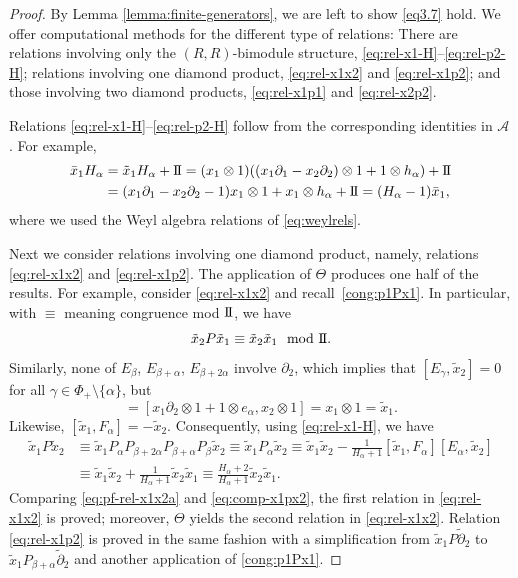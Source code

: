 \documentclass[pdftex]{sigma}
\numberwithin{equation}{section}
\newcommand{\II}{\mathrm{I\hspace{-.1em}I}}
\begin{document}
\begin{proof}
	By Lemma \ref{lemma:finite-generators}, we are left to show \eqref{eq3.7} hold. We offer computational methods for the different type of relations: There are relations involving only the $(R,R)$-bimodule structure, \eqref{eq:rel-x1-H}--\eqref{eq:rel-p2-H}; relations involving one diamond product, \eqref{eq:rel-x1x2} and \eqref{eq:rel-x1p2}; and those involving two diamond products, \eqref{eq:rel-x1p1} and \eqref{eq:rel-x2p2}.
	
	Relations \eqref{eq:rel-x1-H}--\eqref{eq:rel-p2-H} follow from the corresponding identities in $\mathscr{A}$. For example,
	\begin{align*}
		\bar x_1H_\alpha
		&
		= \tilde x_1H_\alpha+\II
		=(x_1\otimes 1)((x_1\partial_1-x_2\partial_2)\otimes 1+1\otimes h_\alpha)+\II
		\\
		&=(x_1\partial_1-x_2\partial_2-1)x_1\otimes 1+x_1\otimes h_\alpha+\II
		= (H_\alpha-1)\bar x_1,
	\end{align*}
	where we used the Weyl algebra relations of \eqref{eq:weylrels}.
	
	Next we consider relations involving one diamond product, namely, relations \eqref{eq:rel-x1x2} and \eqref{eq:rel-x1p2}. The application of $\Theta$ produces one half of the results. For example, consider \eqref{eq:rel-x1x2} and recall~\eqref{cong:p1Px1}.
	In particular, with $\equiv$ meaning congruence mod $\II$, we have
	\begin{equation}\label{eq:pf-rel-x1x2a}
		\tilde x_2 P \tilde x_1 \equiv \tilde x_2\tilde x_1 \mod{\II}.
	\end{equation}
	Similarly, none of $E_\beta$, $E_{\beta+\alpha}$, $E_{\beta+2\alpha}$ involve $\partial_2$, which implies that
$[E_\gamma, \tilde x_2] = 0$ for all $\gamma\in\Phi_+\setminus\{\alpha\}$,
	but
	\begin{equation*}
		[E_\alpha,\tilde x_2] = [x_1\partial_2\otimes 1+1\otimes e_\alpha, x_2\otimes 1] = x_1\otimes 1=\tilde x_1.
	\end{equation*}
	Likewise,
	$[\tilde x_1, F_\alpha] = -\tilde x_2$.
	Consequently, using \eqref{eq:rel-x1-H}, we have
	\begin{align}
			\tilde x_1 P \tilde x_2 &\equiv \tilde x_1P_\alpha P_{\beta+2\alpha}P_{\beta+\alpha}P_\beta \tilde x_2 \equiv \tilde x_1P_\alpha \tilde x_2
			\equiv \tilde x_1 \tilde x_2 - \frac{1}{H_\alpha+1} [\tilde x_1,F_{\alpha}] [E_{\alpha},\tilde x_2]\nonumber\\
			&\equiv \tilde x_1\tilde x_2 + \frac{1}{H_\alpha+1} \tilde x_2 \tilde x_1
			\equiv \frac{H_\alpha+2}{H_\alpha+1} \tilde x_2\tilde x_1.\label{eq:comp-x1px2}
		\end{align}
	Comparing \eqref{eq:pf-rel-x1x2a} and \eqref{eq:comp-x1px2}, the first relation in \eqref{eq:rel-x1x2} is proved; moreover, $\Theta$ yields the second relation in \eqref{eq:rel-x1x2}. Relation \eqref{eq:rel-x1p2} is proved in the same fashion with a simplification from $\tilde{x}_{1}P\tilde{\partial}_{2}$ to $\tilde{x}_{1}P_{\beta+\alpha}\tilde{\partial}_{2}$ and another application of \eqref{cong:p1Px1}.
	

\end{proof}
\end{document}

